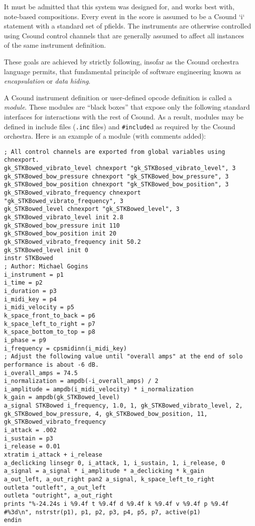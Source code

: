\documentclass[12pt,letterpaper,onecolumn]{scrartcl}
\begin{document}
It must be admitted that this system was designed for, and works best with,
note-based compositions. Every event in the score is assumed to be a Csound
`i` statement with a standard set of pfields. The instruments are otherwise
controlled using Csound control channels that are generally assumed to affect
all instances of the same instrument definition.

These goals are achieved by strictly following, insofar as the
Csound orchestra language permits, that fundamental principle of software
engineering known as \emph{encapsulation} or \emph{data hiding}.

A Csound instrument definition or user-defined opcode definition is called a
\emph{module}. These modules are ``black boxes'' that expose only the following
standard interfaces for interactions with the rest of Csound. As a result,
modules may be defined in include files (\texttt{.inc} files) and
\texttt{\#include}d as required by the Csound orchestra. Here is an example of
a module (with comments added):

\begin{lstlisting}
; All control channels are exported from global variables using chnexport.
gk_STKBowed_vibrato_level chnexport "gk_STKBosed_vibrato_level", 3
gk_STKBowed_bow_pressure chnexport "gk_STKBowed_bow_pressure", 3
gk_STKBowed_bow_position chnexport "gk_STKBowed_bow_position", 3
gk_STKBowed_vibrato_frequency chnexport "gk_STKBowed_vibrato_frequency", 3
gk_STKBowed_level chnexport "gk_STKBowed_level", 3
gk_STKBowed_vibrato_level init 2.8
gk_STKBowed_bow_pressure init 110
gk_STKBowed_bow_position init 20
gk_STKBowed_vibrato_frequency init 50.2
gk_STKBowed_level init 0
instr STKBowed
; Author: Michael Gogins
i_instrument = p1
i_time = p2
i_duration = p3
i_midi_key = p4
i_midi_velocity = p5
k_space_front_to_back = p6
k_space_left_to_right = p7
k_space_bottom_to_top = p8
i_phase = p9
i_frequency = cpsmidinn(i_midi_key)
; Adjust the following value until "overall amps" at the end of solo performance is about -6 dB.
i_overall_amps = 74.5
i_normalization = ampdb(-i_overall_amps) / 2
i_amplitude = ampdb(i_midi_velocity) * i_normalization
k_gain = ampdb(gk_STKBowed_level)
a_signal STKBowed i_frequency, 1.0, 1, gk_STKBowed_vibrato_level, 2, gk_STKBowed_bow_pressure, 4, gk_STKBowed_bow_position, 11, gk_STKBowed_vibrato_frequency
i_attack = .002
i_sustain = p3
i_release = 0.01
xtratim i_attack + i_release
a_declicking linsegr 0, i_attack, 1, i_sustain, 1, i_release, 0
a_signal = a_signal * i_amplitude * a_declicking * k_gain 
a_out_left, a_out_right pan2 a_signal, k_space_left_to_right
outleta "outleft", a_out_left
outleta "outright", a_out_right
prints "%-24.24s i %9.4f t %9.4f d %9.4f k %9.4f v %9.4f p %9.4f #%3d\n", nstrstr(p1), p1, p2, p3, p4, p5, p7, active(p1)
endin
\end{lstlisting}
\end{document}

